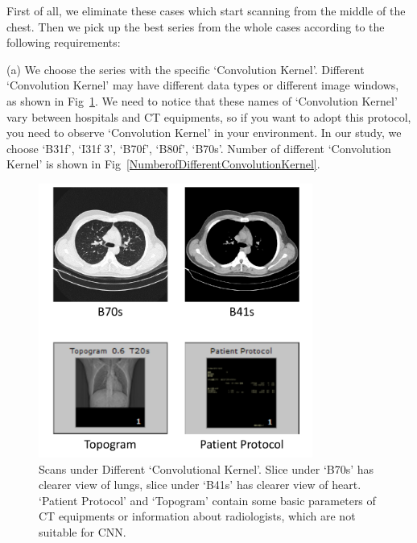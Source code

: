 \documentclass[journal]{IEEEtran}
\begin{document}
First of all, we eliminate these cases which start scanning from the middle of the chest. Then we pick up the best series from the whole cases according to the following requirements:

(a) We choose the series with the specific `Convolution Kernel'. Different `Convolution Kernel' may have different data types or different image windows, as shown in Fig~\ref{Bs}. We need to notice that these names of `Convolution Kernel' vary between hospitals and CT equipments, so if you want to adopt this protocol, you need to observe `Convolution Kernel' in your environment. In our study, we choose `B31f', `I31f 3', `B70f', `B80f', `B70s'. Number of different `Convolution Kernel' is shown in Fig~\ref{NumberofDifferentConvolutionKernel}. 

\begin{figure}[t]
    \centerline{\includegraphics[width=90mm]{Bs.pdf}}
    \vspace{-0cm}
    \caption{Scans under Different `Convolutional Kernel'. Slice under `B70s' has clearer view of lungs, slice under `B41s' has clearer view of heart. `Patient Protocol' and `Topogram' contain some basic parameters of CT equipments or information about radiologists, which are not suitable for CNN.}
    \vspace{-0cm}
    \label{Bs}
    \end{figure}
\end{document}
